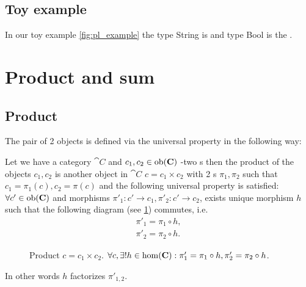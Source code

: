 \subsection{Toy example}

\begin{example}
In our toy example \cref{fig:pl_example} the type String is
 and type Bool is the
.
\end{example}

\section{Product and sum}

\subsection{Product}
The pair of 2 objects is defined via the universal property in
the following way:
\begin{definition}[Product]
\label{def:product}
Let we have a category $\cat{C}$ and $c_1, c_2 \in \mathrm{ob}(\mathbf{C})$ -two
s then the product of the objects $c_1, c_2$ is
another object in $\cat{C}$ $c = c_1 \times c_2$ with 2
s $\pi_1, \pi_2$ such that $c_1 = \pi_1(c),
c_2 = \pi(c)$ and the  
following universal property is satisfied: $\forall c' \in \mathrm{ob}(\mathbf{C})$
and morphisms $\pi'_1: c' \to c_1, \pi'_2: c' \to c_2$, exists unique
morphism $h$ such that the following diagram (see \cref{fig:product})
commutes, i.e. 
\begin{eqnarray}
\pi'_1 = \pi_1 \circ h, 
\nonumber \\
\pi'_2 = \pi_2 \circ h.
\label{eq:product}
\end{eqnarray}
\begin{figure}[H]
  \centering
  \caption{Product $c = c_1 \times c_2$. $\forall c, \exists! h \in
    \mathrm{hom}(\mathbf{C}): \pi'_1 = \pi_1 \circ h, \pi'_2 = \pi_2 \circ h$.}
  \label{fig:product}
\end{figure}
In other words $h$ factorizes $\pi'_{1,2}$.
\end{definition}

